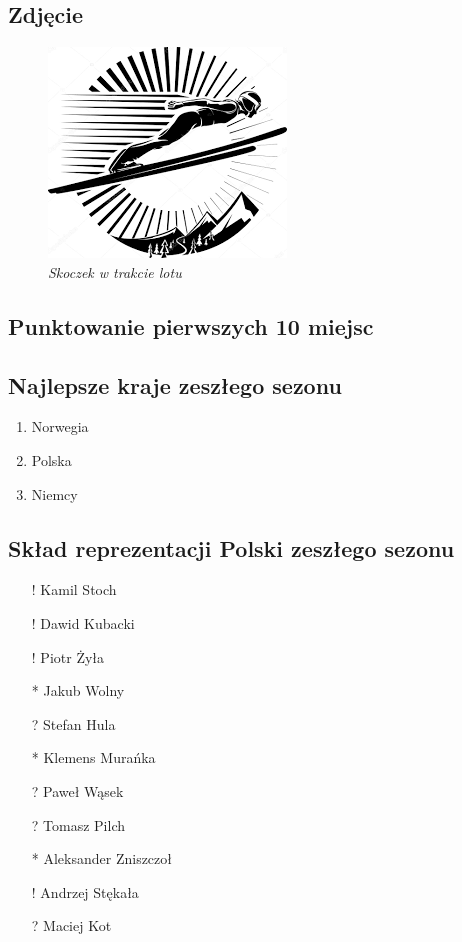 \subsection{Zdjęcie}
\graphicspath{ {./Pictures/} }
    \begin{figure}[ht]
    \centering
    \includegraphics[scale=0.8]{Pictures/skoczek.png}
    \caption{\emph{Skoczek w trakcie lotu}}
    \label{fig:skoczek}
    \end{figure}

\subsection{Punktowanie pierwszych 10 miejsc}
    

\subsection{Najlepsze kraje zeszłego sezonu}
    \begin {enumerate} 
        \item Norwegia
        \item Polska
        \item Niemcy
     \end {enumerate}
 
\subsection{Skład reprezentacji Polski zeszłego sezonu}
    \begin{itemize}
        \item[!] Kamil Stoch
        \item[!] Dawid Kubacki
        \item[!] Piotr Żyła
        \item[*] Jakub Wolny
        \item[?] Stefan Hula
        \item[*] Klemens Murańka
        \item[?] Paweł Wąsek
        \item[?] Tomasz Pilch
        \item[*] Aleksander Zniszczoł
        \item[!] Andrzej Stękała
        \item[?] Maciej Kot
    \end{itemize}